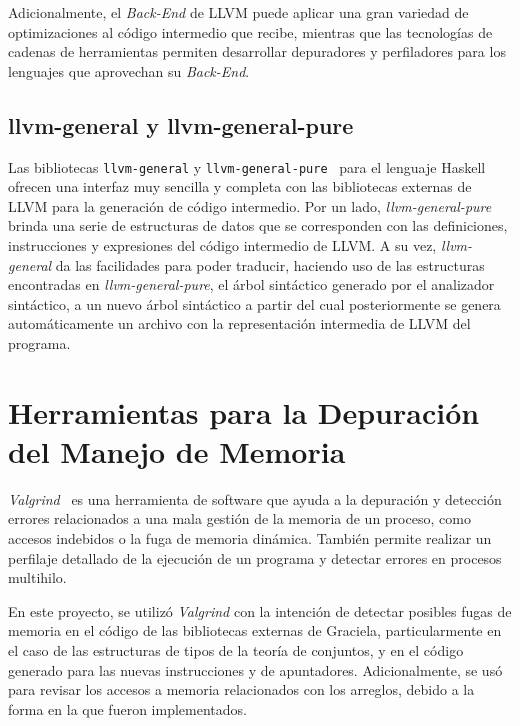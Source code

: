 Adicionalmente, el \textit{Back-End} de LLVM puede aplicar una gran variedad de
optimizaciones al código intermedio que recibe, mientras que las tecnologías de
cadenas de herramientas permiten desarrollar depuradores y perfiladores para los
lenguajes que aprovechan su \textit{Back-End}.

\subsection{llvm-general y llvm-general-pure}

Las bibliotecas \texttt{llvm-general} y
\texttt{llvm-general-pure}~\cite{llvm-general, llvm-general-pure} para el
lenguaje Haskell ofrecen una interfaz muy sencilla y completa con las
bibliotecas externas de LLVM para la generación de código intermedio. Por un
lado, \textit{llvm-general-pure} brinda una serie de estructuras de datos que se
corresponden con las definiciones, instrucciones y expresiones del código
intermedio de LLVM. A su vez, \textit{llvm-general} da las facilidades para
poder traducir, haciendo uso de las estructuras encontradas en
\textit{llvm-general-pure}, el árbol sintáctico generado por el analizador
sintáctico, a un nuevo árbol sintáctico a partir del cual posteriormente se
genera automáticamente un archivo con la representación intermedia de LLVM del
programa.


\section{Herramientas para la Depuración del Manejo de Memoria}

\textit{Valgrind}~\cite{valgrind} es una herramienta de software que ayuda a la
depuración y detección errores relacionados a una mala gestión de la memoria de
un proceso, como accesos indebidos o la fuga de memoria dinámica. También
permite realizar un perfilaje detallado de la ejecución de un programa y
detectar errores en procesos multihilo.

En este proyecto, se utilizó \textit{Valgrind} con la intención de detectar
posibles fugas de memoria en el código de las bibliotecas externas de Graciela,
particularmente en el caso de las estructuras de tipos de la teoría de
conjuntos, y en el código generado para las nuevas instrucciones  y
 de apuntadores. Adicionalmente, se usó para revisar los accesos a
memoria relacionados con los arreglos, debido a la forma en la que fueron
implementados.

